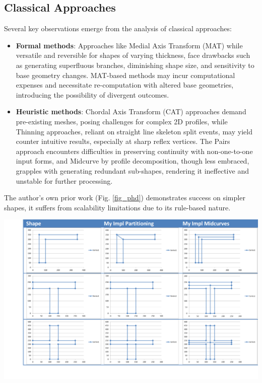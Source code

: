\documentclass[10pt, conference]{IEEEtran}
\begin{document}
\subsection{Classical Approaches}
\label{subsec:1}
Several key observations emerge from the analysis of classical approaches:
\begin{itemize}
\item {\bf Formal methods}: Approaches like Medial Axis Transform (MAT) while versatile and reversible for shapes of varying thickness, face drawbacks such as generating superfluous branches, diminishing shape size, and sensitivity to base geometry changes. MAT-based methods may incur computational expenses and necessitate re-computation with altered base geometries, introducing the possibility of divergent outcomes.
\item {\bf Heuristic methods}: Chordal Axis Transform (CAT) approaches demand pre-existing meshes, posing challenges for complex 2D profiles, while Thinning approaches, reliant on straight line skeleton split events, may yield counter intuitive results, especially at sharp reflex vertices. The Pairs approach encounters difficulties in preserving continuity with non-one-to-one input forms, and Midcurve by profile decomposition, though less embraced, grapples with generating redundant sub-shapes, rendering it ineffective and unstable for further processing.
\end{itemize}

The author's own prior work (Fig. \ref{fig_phd})  demonstrates success on simpler shapes, it suffers from scalability limitations due to its rule-based nature.

     \begin{center}
	\includegraphics[width=\linewidth]{images/midcurve16}
	 \cite{kulkarni2017}
	\label{fig_phd}
    \end{center}
\end{document}
